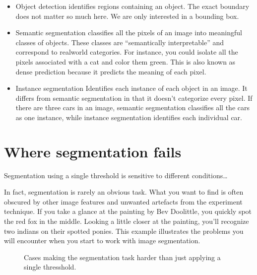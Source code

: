\documentclass[letterpaper,10pt,english]{sphinxmanual}
\begin{document}
\sphinxAtStartPar
{}
\begin{itemize}
\item {} 
\sphinxAtStartPar
Object detection \sphinxhyphen{} identifies regions containing an object. The exact boundary does not matter so much here. We are only interested in a bounding box.

\item {} 
\sphinxAtStartPar
Semantic segmentation \sphinxhyphen{} classifies all the pixels of an image into meaningful classes of objects. These classes are “semantically interpretable” and correspond to real\sphinxhyphen{}world categories. For instance, you could isolate all the pixels associated with a cat and color them green. This is also known as dense prediction because it predicts the meaning of each pixel.

\item {} 
\sphinxAtStartPar
Instance segmentation \sphinxhyphen{} Identifies each instance of each object in an image. It differs from semantic segmentation in that it doesn’t categorize every pixel. If there are three cars in an image, semantic segmentation classifies all the cars as one instance, while instance segmentation identifies each individual car.

\end{itemize}


\chapter{Where segmentation fails}
\label{\detokenize{05-AdvancedSegmentation:where-segmentation-fails}}
\sphinxAtStartPar
Segmentation using a single threshold is sensitive to different conditions…

\sphinxAtStartPar
In fact, segmentation is rarely an obvious task. What you want to find is often obscured by other image features and unwanted artefacts from the experiment technique. If you take a glance at the painting by Bev Doolittle, you quickly spot the red fox in the middle. Looking a little closer at the painting, you’ll recognize two indians on their spotted ponies. This example illustrates the problems you will encounter when you start to work with image segmentation.

\begin{figure}[htbp]
\centering
\capstart

\noindent{}
\caption{Cases making the segmentation task harder than just applying a single thresshold.}\label{\detokenize{05-AdvancedSegmentation:id2}}\end{figure}
\end{document}
